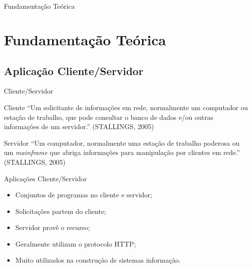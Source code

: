 \section*{}
\begin{frame}
	\centering
	{\Huge Fundamentação Teórica}
\end{frame}

\section{Fundamentação Teórica}\label{sec:fundamentacao-teorica}

\subsection*{Aplicação Cliente/Servidor}

\begin{frame}{Cliente/Servidor}
	\begin{block}{Cliente}
		``Um solicitante de informações em rede, normalmente um computador ou 
		estação de trabalho, que pode consultar o banco de dados e/ou outras 
		informações de um servidor.'' (STALLINGS, 2005)
	\end{block}
	\begin{block}{Servidor}
		``Um computador, normalmente uma estação de trabalho poderosa ou um 
		\textit{mainframe} que abriga informações para manipulação por clientes 
		em rede.'' (STALLINGS, 2005)
	\end{block}
\end{frame}
\begin{frame}{Aplicações Cliente/Servidor}
	\begin{itemize}
		\item Conjuntos de programas no cliente e servidor; \pause
		\item Solicitações partem do cliente; \pause
		\item Servidor provê o recurso; \pause
		\item Geralmente utilizam o protocolo HTTP; \pause
		\item Muito utilizados na construção de sistemas informação.
	\end{itemize}
\end{frame}


